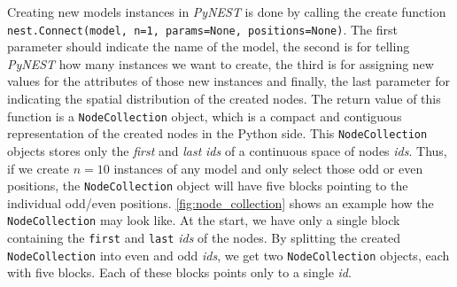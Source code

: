 Creating new models instances in \emph{PyNEST} is done by calling the create function \\\texttt{nest.Connect(model, n=1, params=None, positions=None)}. The first parameter should indicate the name of the model, the second is for telling \emph{PyNEST} how many instances we want to create, the third is for assigning new values for the attributes of those new instances and finally, the last parameter for indicating the spatial distribution of the created nodes. The return value of this function is a \texttt{NodeCollection} object, which is a compact and contiguous representation of the created nodes in the Python side. This \texttt{NodeCollection} objects stores only the \emph{first} and \emph{last} \emph{ids} of a continuous space of nodes \emph{ids}. Thus, if we create $n=10$ instances of any model and only select those odd or even positions, the \texttt{NodeCollection} object will have five blocks pointing to the individual odd/even positions. \autoref{fig:node_collection} shows an example how the \texttt{NodeCollection} may look like. At the start, we have only a single block containing the \texttt{first} and \texttt{last} \emph{ids} of the nodes. By splitting the created \texttt{NodeCollection} into even and odd \emph{ids}, we get two \texttt{NodeCollection} objects, each with five blocks. Each of these blocks points only to a single \emph{id}.


